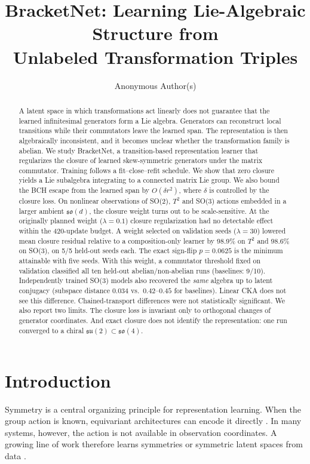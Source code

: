 \documentclass[10pt]{article}
\title{BracketNet: Learning Lie-Algebraic Structure from\\ Unlabeled Transformation Triples}
\author{Anonymous Author(s)}
\date{}
\newcommand{\so}{\mathfrak{so}}
\begin{document}
\maketitle

\begin{abstract}
A latent space in which transformations act linearly does not guarantee that the learned infinitesimal
generators form a Lie algebra. Generators can reconstruct local transitions while their commutators leave the
learned span. The representation is then algebraically inconsistent, and it becomes unclear whether the
transformation family is abelian. We study BracketNet, a transition-based representation learner that regularizes
the closure of learned skew-symmetric generators under the matrix commutator. Training follows a
fit--close--refit schedule. We show that zero closure yields a Lie subalgebra integrating to a connected matrix Lie
group. We also bound the BCH escape from the learned span by $O(\delta r^2)$, where $\delta$ is controlled by the
closure loss. On nonlinear observations of SO(2), $T^2$ and SO(3) actions embedded in a larger ambient $\so(d)$,
the closure weight turns out to be scale-sensitive. At the originally planned weight ($\lambda{=}0.1$) closure
regularization had no detectable effect within the 420-update budget. A weight selected on validation seeds
($\lambda{=}30$) lowered mean closure residual relative to a composition-only learner by 98.9\% on $T^2$ and 98.6\%
on SO(3), on 5/5 held-out seeds each. The exact sign-flip $p=0.0625$ is the minimum attainable with five seeds.
With this weight, a commutator threshold fixed on validation classified all ten held-out abelian/non-abelian runs
(baselines: 9/10). Independently trained SO(3) models also recovered the \emph{same} algebra up to latent
conjugacy (subspace distance $0.034$ vs.\ $0.42$--$0.45$ for baselines). Linear CKA does not see this difference.
Chained-transport differences were not statistically significant. We also report two limits. The closure loss is
invariant only to orthogonal changes of generator coordinates. And exact closure does not identify the
representation: one run converged to a chiral $\mathfrak{su}(2)\subset\so(4)$.
\end{abstract}

\section{Introduction}
Symmetry is a central organizing principle for representation learning. When the group action is known,
equivariant architectures can encode it directly \citep{cohen2016,bronstein2021}. In many systems, however, the
action is not available in observation coordinates. A growing line of work therefore learns symmetries or symmetric
latent spaces from data \citep{dehmamy2021,yang2023,yang2024,keurti2023,park2022,gabel2023}.
\end{document}
